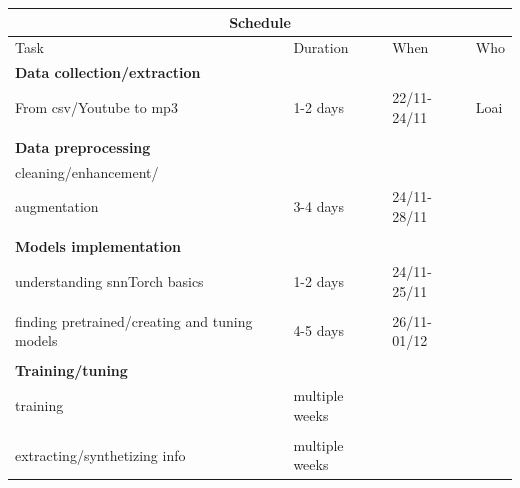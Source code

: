 \documentclass[11pt]{article}
\begin{document}
\begin{center}
  \begin{tabular}{ |p{5cm}||p{3cm}|p{3cm}|p{2cm}|  }
    \hline
    \multicolumn{4}{|c|}{Schedule}                                                            \\
    \hline
    Task                                          & Duration             & When        & Who  \\
    \hline
    \textbf{Data collection/extraction}           &                      &             &      \\
    From csv/Youtube to mp3                       & 1-2 days             & 22/11-24/11 & Loai \\
                                                  &                      &             &      \\
    \textbf{Data preprocessing}                   &                      &             &      \\
    cleaning/enhancement/                         &                      &             &      \\
    augmentation                                  & 3-4 days             & 24/11-28/11 &      \\
                                                  &                      &             &      \\
    \textbf{Models implementation}                &                      &             &      \\
    understanding snnTorch basics                 & 1-2 days             & 24/11-25/11 &      \\
                                                  &                      &             &      \\
    finding pretrained/creating and tuning models & 4-5 days             & 26/11-01/12 &      \\
                                                  &                      &             &      \\
    \textbf{Training/tuning}                      &                      &             &      \\
    training                                      & multiple weeks       &             &      \\
                                                  &                      &             &      \\
    extracting/synthetizing info                  & multiple weeks       &             &      \\

\end{tabular}
\end{center}
\end{document}
